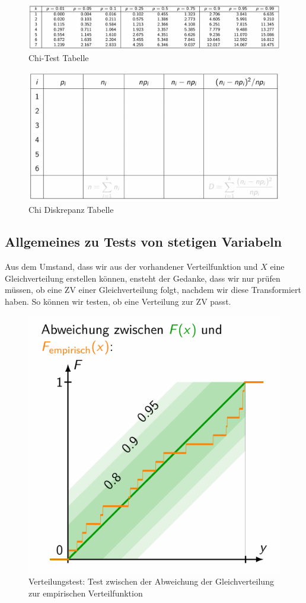 \documentclass[../Main.tex]{subfiles}
\begin{document}
\begin{figure}[H]
    \centering
    \includegraphics[width=1\linewidth]{Images/x-test-tabelle.png}
    \caption{Chi-Test Tabelle}
\end{figure}

\begin{figure}[H]
    \centering
    \includegraphics[width=1\linewidth]{Images/diskrepanz-tabelle.png}
    \caption{Chi Diskrepanz Tabelle}
\end{figure}

\subsection{Allgemeines zu Tests von stetigen Variabeln}
Aus dem Umstand, dass wir aus der vorhandener Verteilfunktion und \(X\)
eine Gleichverteilung erstellen können, ensteht der Gedanke, dass wir
nur prüfen müssen, ob eine ZV einer Gleichverteilung folgt, nachdem wir diese Transformiert haben.
So können wir testen, ob eine Verteilung zur ZV passt.

\begin{figure}[H]
    \centering
    \includegraphics[width=0.5\linewidth]{Images/verteilungs-test.png}
    \caption{Verteilungstest: Test zwischen der Abweichung der Gleichverteilung zur empirischen Verteilfunktion}
\end{figure}
\end{document}
